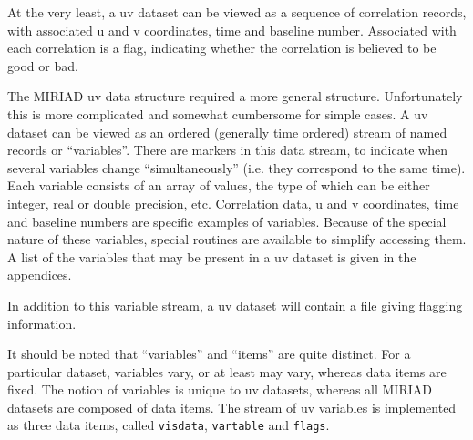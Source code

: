 

At the very least, a uv dataset can be viewed as a sequence of 
correlation
records, with associated u and v coordinates, time and baseline number.
Associated with each correlation is a flag, indicating whether the
correlation is believed to be good or bad.

The MIRIAD uv data structure required a more general structure. Unfortunately
this is more complicated and somewhat cumbersome for simple cases.
A uv dataset can be viewed as an ordered (generally time ordered) stream of
named records or ``variables''. There are markers in this data stream, to
indicate when
several variables change ``simultaneously'' (i.e. they correspond to the
same time). Each variable
consists of an array of values, the type of which can be either integer, real
or double precision, etc. Correlation data, u and v coordinates,
time and baseline numbers are specific examples of variables.
Because of the special nature of these variables, special routines are
available to simplify accessing them. A list of the variables
that may be present in a uv dataset is given in the appendices.

In addition to this variable stream, a uv dataset will contain a file giving
flagging information.

It should be noted that ``variables'' and ``items''
are quite distinct. For a particular dataset, variables vary, or at least may
vary,
whereas data items are fixed. The notion of variables is unique to uv datasets,
whereas all MIRIAD datasets are composed of data items. The stream of
uv variables is implemented as three data items, called {\tt visdata},
{\tt vartable} and {\tt flags}.

